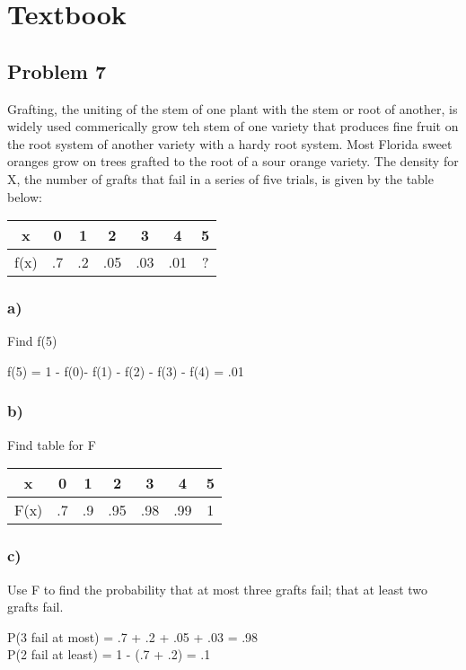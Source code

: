 \documentclass{article}
\begin{document}
\section*{Textbook}
\subsection*{Problem 7}
Grafting, the uniting of the stem of one plant with the stem or root of another, is widely used commerically grow teh stem of one variety that produces fine fruit on the root system of another variety with a hardy root system. Most Florida sweet oranges grow on trees grafted to the root of a sour orange variety. The density for X, the number of grafts that fail in a series of five trials, is given by the table below:
\begin{center}
    \begin{tabular}{c|c|c|c|c|c|c}
        x & 0 & 1 & 2 & 3 & 4 & 5 \\
        \hline
        f(x) & .7 & .2 & .05 & .03 & .01 & ? \\
    \end{tabular}
\end{center}
\subsubsection*{a)}
Find f(5)  
\begin{center}
    f(5) = 1 - f(0)- f(1) - f(2) - f(3) - f(4) = .01
\end{center}
\subsubsection*{b)}
Find table for F
\begin{center}
    \begin{tabular}{c|c|c|c|c|c|c}
        x & 0 & 1 & 2 & 3 & 4 & 5 \\
        \hline
        F(x) & .7 & .9 & .95 & .98 & .99 & 1 \\
    \end{tabular}
\end{center}
\subsubsection*{c)}
Use F to find the probability that at most three grafts fail; that at least two grafts fail.
\begin{center}
P(3 fail at most) =  .7 + .2 + .05 + .03 = .98\\
P(2 fail at least) =  1 - (.7 + .2) = .1    
\end{center}
\end{document}
